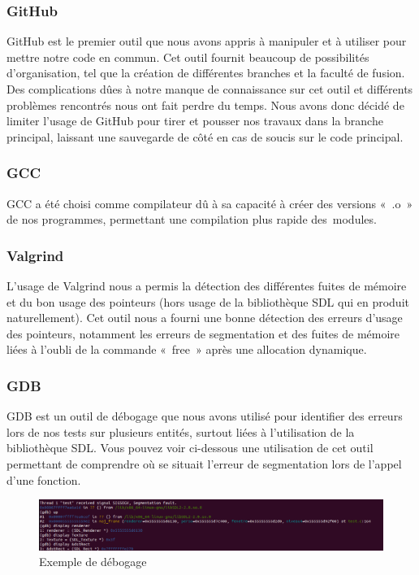 \documentclass[12pt,a4paper]{article}
\begin{document}
            \subsubsection{GitHub}
                \tabto{1cm} GitHub est le premier outil que nous avons appris à manipuler et à utiliser pour mettre notre code en commun. Cet outil fournit beaucoup de possibilités d’organisation, tel que la création de différentes branches et la faculté de fusion. Des complications dûes à notre manque de connaissance sur cet outil et différents problèmes rencontrés nous ont fait perdre du temps. Nous avons donc décidé de limiter l’usage de GitHub pour tirer et pousser nos travaux dans la branche principal, laissant une sauvegarde de côté en cas de soucis sur le code principal.

            \subsubsection{GCC}
                \tabto{1cm} GCC a été choisi comme compilateur dû à sa capacité à créer des versions «~.o~» de nos programmes, permettant une compilation plus rapide des~modules.
            
            \subsubsection{Valgrind}
                \tabto{1cm} L’usage de Valgrind nous a permis la détection des différentes fuites de mémoire et du bon usage des pointeurs (hors usage de la bibliothèque SDL qui en produit naturellement). Cet outil nous a fourni une bonne détection des erreurs d’usage des pointeurs, notamment les erreurs de segmentation et des fuites de mémoire liées à l’oubli de la commande «~free~» après une allocation dynamique.
                
            \subsubsection{GDB}
                \tabto{1cm} GDB est un outil de débogage que nous avons utilisé pour identifier des erreurs lors de nos tests sur plusieurs entités, surtout liées à l’utilisation de la bibliothèque SDL. Vous pouvez voir ci-dessous une utilisation de cet outil permettant de comprendre où se situait l’erreur de segmentation lors de l’appel d’une fonction.\\

                \begin{figure}[h]
                    \centering
                    \includegraphics[width=13cm]{images/debogage.png}
                    \caption{Exemple de débogage}
                \end{figure}
\end{document}
